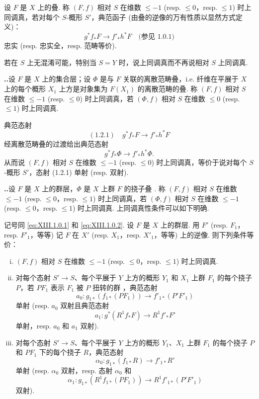 \begin{definition}\label{def:XIII.1.1}
设 $F$ 是 $X$ 上的叠. 称 $(F, f)$ 相对 $S$ 在维数 $\leqslant -1$ (resp. $\leqslant 0$，resp. $\leqslant 1$) 时上同调真，若对每个 $S$-概形 $S'$，典范函子 (由叠的逆像的万有性质以显然方式定义)：
\[
g^{*} f_* F \longrightarrow f'_* h^{*} F \quad \text{(参见 1.0.1)}
\]
忠实 (resp. 忠实全，resp. 范畴等价).
\end{definition}

若在 $S$ 上无混淆可能，特别当 $S = Y$ 时，说上同调真而不再说相对 $S$ 上同调真.

\noindent\textbf{\thesection..}\quad 设 $F$ 是 $X$ 上的集合层；设 $\Phi$ 是与 $F$ 关联的离散范畴叠，i.e. 纤维在平展于 $X$ 上的每个概形 $X_1$ 上方是对象集为 $F(X_1)$ 的离散范畴的叠. 称 $(F, f)$ 相对 $S$ 在维数 $\leqslant -1$ (resp. $\leqslant 0$) 时上同调真，若 $(\Phi, f)$ 相对 $S$ 在维数 $\leqslant 0$ (resp. $\leqslant 1$) 时上同调真.

典范态射
\[
(1.2.1) \quad g^{*} f_* F \longrightarrow f'_* h^{*} F
\]
经离散范畴叠的过渡给出典范态射
\[
g^{*} f_* \Phi \longrightarrow f'_* h^{*} \Phi.
\]
从而说 $(F, f)$ 相对 $S$ 在维数 $\leqslant -1$ (resp. $\leqslant 0$) 时上同调真，等价于说对每个 $S$-概形 $S'$，态射 (1.2.1) 单射 (resp. 双射).

\noindent\textbf{\thesection..}\quad 设 $F$ 是 $X$ 上的群层，$\Phi$ 是 $X$ 上群 $F$ 的挠子叠 \cite[II 2.3.2]{exp13-1}. 称 $(F, f)$ 相对 $S$ 在维数 $\leqslant -1$ (resp. $\leqslant 0$，resp. $\leqslant 1$) 时上同调真，若 $(\Phi, f)$ 相对 $S$ 在维数 $\leqslant -1$ (resp. $\leqslant 0$，resp. $\leqslant 1$) 时上同调真. 上同调真性条件可以如下明确.

\begin{proposition}\label{prop:XIII.1.3.1}
记号同 \eqref{eq:XIII.1.0.1} 和 \eqref{eq:XIII.1.0.2}. 设 $F$ 是 $X$ 上的群层. 用 $F'$ (resp. $F_1$，resp. $F'_1$，等等) 记 $F$ 在 $X'$ (resp. $X_1$，resp. $X'_1$，等等) 上的逆像. 则下列条件等价：
\begin{enumerate}[i)]
\item $(F, f)$ 相对 $S$ 在维数 $\leqslant -1$ (resp. $\leqslant 0$，resp. $\leqslant 1$) 时上同调真.
\item 对每个态射 $S' \to S$、每个平展于 $Y$ 上方的概形 $Y_1$ 和 $X_1$ 上群 $F_1$ 的每个挠子 $P$，若 $P F_1$ 表示 $F_1$ 被 $P$ 扭转的群 \cite[II 4.1.2.3]{exp13-1}，典范态射
\[
a_0 \colon g_{1*}(f_{1*}(P F_1)) \longrightarrow f'_{1*}(P' F'_1)
\]
单射 (resp. $a_0$ 双射且典范态射
\[
a_1 \colon g^{*}(R^1 f_* F) \longrightarrow R^1 f'_* F'
\]
单射，resp. $a_0$ 和 $a_1$ 双射).
\item[(ii bis)] 对每个态射 $S' \to S$、每个平展于 $Y$ 上方的概形 $Y_1$、$X_1$ 上群 $F_1$ 的每个挠子 $P$ 和 $P F_1$ 下的每个挠子 $R$，典范态射
\[
\alpha_0 \colon g_{1*}(f_{1*} R) \longrightarrow f'_{1*} R'
\]
单射 (resp. $\alpha_0$ 双射，resp. 态射 $\alpha_0$ 和
\[
\alpha_1 \colon g_{1*}(R^1 f_{1*}(P F_1)) \longrightarrow R^1 f'_{1*}(P' F'_1)
\]
双射).
\end{enumerate}
\end{proposition}

